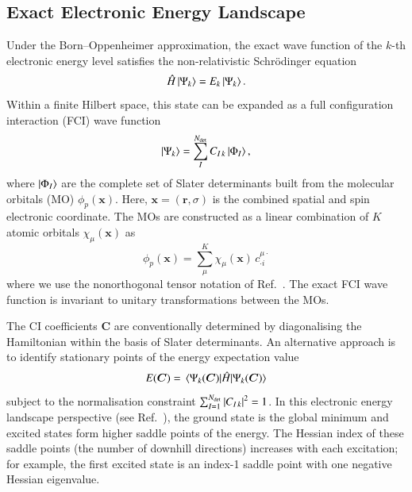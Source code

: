 \documentclass[aip,jcp,reprint,noshowkeys,superscriptaddress]{revtex4-1}
\newcommand{\hugh}[1]{\textcolor{hughgreen}{#1}}
\newcommand{\Norb}{K}
\newcommand{\Ndet}{N_\text{det}}
\newcommand{\bC}{\bm{C}}
\newcommand{\br}{\bm{r}}
\newcommand{\bx}{\bm{x}}
\begin{document}
\subsection{Exact Electronic Energy Landscape}
\label{subsec:exactLandscape}
\hugh{Under the Born--Oppenheimer approximation, the exact wave function of the $k$-th electronic energy level satisfies the 
non-relativistic Schr\"{o}dinger equation\cite{Szabo_1996}
\begin{equation}
\Hat{H} \ket{\Psi_k} = E_k \ket{\Psi_k}.
\label{eq:schro_eq}
\end{equation}
Within a finite Hilbert space, this state can be expanded as a full configuration interaction (FCI) wave function
\begin{equation}
  \label{eq:fci_wf}
  \ket{\Psi_{k}} = \sum_I^{\Ndet} C_{I\,k}\ket{\Phi_I},
\end{equation}
where $\ket{\Phi_I}$ are the complete set of Slater determinants built from the molecular orbitals (MO) $\phi_p(\bx)$.
Here, $\bx = (\br,\sigma)$ is the combined spatial and spin electronic coordinate.
The MOs are constructed as a linear combination of $\Norb$ atomic orbitals $\chi_{\mu} (\bx)$ as
\begin{equation}
  \label{eq:mo}
  \phi_p(\bx) = \sum^K_\mu \chi_{\mu}(\bx)\, c_{\cdot i}^{\mu \cdot}
\end{equation}
where we use the nonorthogonal tensor notation of Ref.~\onlinecite{Head-Gordon_1998}. 
The exact FCI wave function is invariant to unitary transformations between the MOs.
} 

The CI coefficients $\bm{C}$ are conventionally determined by diagonalising the Hamiltonian within the basis of Slater determinants.
An alternative approach is to identify stationary points of the energy expectation value 
\begin{equation}
  \label{eq:fci_nrj}
  E(\bC) = \mel{\Psi_{k}(\bC)}{\hH}{\Psi_{k}(\bC)}
\end{equation}
subject to the normalisation constraint $\sum_{I=1}^{\Ndet} \abs{C_{I\,k}}^2 = 1$.
\hugh{In this electronic energy landscape perspective (see Ref.~\onlinecite{Burton_2022}), the ground state is the global minimum 
and excited states form higher saddle points of the energy.\cite{Burton_2021,Burton_2022} 
The Hessian index of these saddle points (the number of downhill directions) increases with each excitation; for example, 
the first excited state is an index-1 saddle point with one negative Hessian eigenvalue.\cite{Burton_2022,Bacalis_2016,Bacalis_2020,Golab_1983}
}
\end{document}

